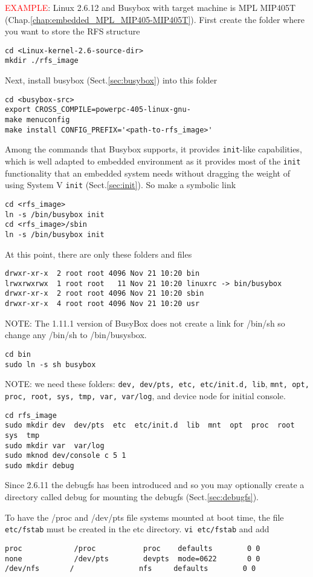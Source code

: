\textcolor{red}{EXAMPLE}: Linux 2.6.12 and Busybox with target machine is MPL
MIP405T (Chap.\ref{chap:embedded_MPL_MIP405-MIP405T}). First create the folder
where you want to store the RFS structure
\begin{verbatim}
cd <Linux-kernel-2.6-source-dir>
mkdir ./rfs_image
\end{verbatim}

Next, install busybox (Sect.\ref{sec:busybox}) into this folder
\begin{verbatim}
cd <busybox-src>
export CROSS_COMPILE=powerpc-405-linux-gnu-
make menuconfig
make install CONFIG_PREFIX='<path-to-rfs_image>'
\end{verbatim}

Among the commands that Busybox supports, it provides \verb!init!-like
capabilities, which is well adapted to embedded environment as it provides most
of the \verb!init! functionality that an embedded system needs without dragging
the weight of using System V \verb!init! (Sect.\ref{sec:init}). So make a
symbolic link
\begin{verbatim}
cd <rfs_image>
ln -s /bin/busybox init
cd <rfs_image>/sbin
ln -s /bin/busybox init
\end{verbatim}
At this point, there are only these folders and files
\begin{verbatim}
drwxr-xr-x  2 root root 4096 Nov 21 10:20 bin
lrwxrwxrwx  1 root root   11 Nov 21 10:20 linuxrc -> bin/busybox
drwxr-xr-x  2 root root 4096 Nov 21 10:20 sbin
drwxr-xr-x  4 root root 4096 Nov 21 10:20 usr
\end{verbatim}

NOTE: The 1.11.1 version of BusyBox does not create a link for /bin/sh so change
any /bin/sh to /bin/busysbox.
\begin{verbatim}
cd bin
sudo ln -s sh busybox
\end{verbatim}

NOTE: we need these folders:
\verb!dev, dev/pts, etc, etc/init.d, lib!, 
\verb!mnt, opt, proc, root, sys, tmp, var, var/log!, and device node for initial
console.
\begin{verbatim}
cd rfs_image
sudo mkdir dev  dev/pts  etc  etc/init.d  lib  mnt  opt  proc  root  sys  tmp 
sudo mkdir var  var/log 
sudo mknod dev/console c 5 1
sudo mkdir debug
\end{verbatim}
Since 2.6.11 the debugfs has been introduced and so you may optionally create a
directory called debug for mounting the debugfs (Sect.\ref{sec:debugfs}).

To have the /proc and /dev/pts file systems mounted at boot time, the file
\verb!etc/fstab! must be created in the etc directory. \verb!vi etc/fstab! and
add
\begin{verbatim}
proc            /proc           proc    defaults        0 0
none            /dev/pts        devpts  mode=0622       0 0
/dev/nfs       /               nfs     defaults        0 0
\end{verbatim}

